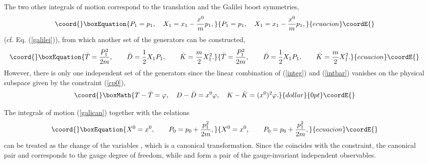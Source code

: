 \documentclass[a4paper,12pt]{article}
\begin{document}
The two other integrals of motion correspond to the
translation
and the Galilei boost symmetries,
\begin{equation}\coord{}\boxEquation{
P_1=p_1,\quad
X_1=x_1-\frac{x^0}{m}p_1,
\label{galican}
}{
P_1=p_1,\quad
X_1=x_1-\frac{x^0}{m}p_1,
}{ecuacion}\coordE{}\end{equation}
(cf. Eq. (\ref{galilei})),
from which another set of the
\coordHE{} generators
can be constructed,
\begin{equation}\coord{}\boxEquation{
\bar T=\frac{P_1^2}{2m},\qquad
\bar D=\frac{1}{2}X_1P_1,\qquad
\bar K=\frac{m}{2}X_1^2.
\label{intbar}
}{
\bar T=\frac{P_1^2}{2m},\qquad
\bar D=\frac{1}{2}X_1P_1,\qquad
\bar K=\frac{m}{2}X_1^2.
}{ecuacion}\coordE{}\end{equation}
However, there is only one independent set
of the \coordHE{} generators since the linear
combination of
(\ref{integ}) and (\ref{intbar})
vanishes on the physical subspace given
by the constraint (\ref{cp0}),
$$\coord{}\boxMath{
T-\bar T=\varphi,\quad
D-\bar D=x^0\varphi,\quad
K-\bar K=(x^0)^2\varphi.
}{dollar}{0pt}\coordE{}$$

The integrals of motion (\ref{galican})
together  with the relations
\begin{equation}\coord{}\boxEquation{
X^0=x^0,\qquad P_0=p_0+\frac{p_1^2}{2m},
\label{x0p0}
}{
X^0=x^0,\qquad P_0=p_0+\frac{p_1^2}{2m},
}{ecuacion}\coordE{}\end{equation}
can be treated as the change of the variables
\coordHE{},
which is a canonical transformation.
Since the \coordHE{} coincides with the constraint,
the canonical pair \coordHE{} and \coordHE{} corresponds to the gauge
degree of freedom, while
\coordHE{} and \coordHE{} form a pair of the gauge-invariant
independent observables.
\end{document}
